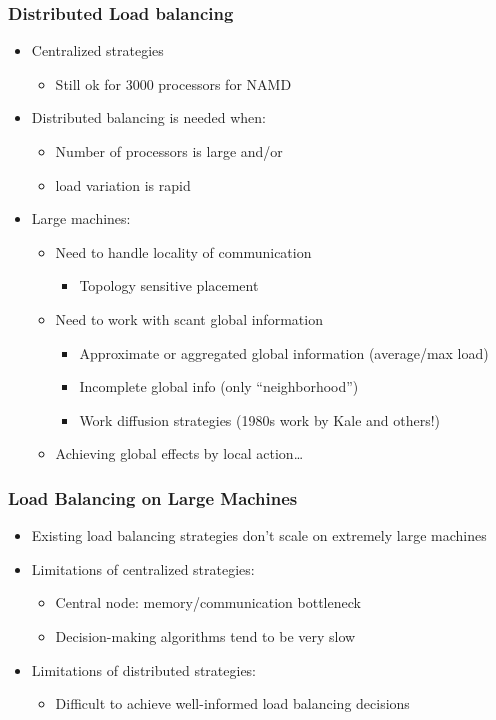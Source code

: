 \begin{frame}[fragile]
\frametitle{Distributed Load balancing}
\begin{itemize}
 \item Centralized strategies
 \begin{itemize}
  \item Still ok for 3000 processors for NAMD
 \end{itemize}
 \item Distributed balancing is needed when:
 \begin{itemize}
  \item Number of processors is large and/or 
  \item load variation is rapid
 \end{itemize}
 \item Large machines: 
 \begin{itemize}
  \item Need to handle locality of communication
  \begin{itemize}
   \item Topology sensitive placement
  \end{itemize}
  \item Need to work with scant global information
  \begin{itemize}
   \item Approximate or aggregated global information (average/max load)
   \item Incomplete global info (only “neighborhood”)
   \item Work diffusion strategies (1980s work by Kale and others!)
  \end{itemize}
  \item Achieving global effects by local action…
 \end{itemize}
\end{itemize}
\end{frame}

\begin{frame}[fragile]
\frametitle{Load Balancing on Large Machines}
\begin{itemize}
 \item Existing load balancing strategies don’t scale on extremely large machines
 \item Limitations of centralized strategies:
 \begin{itemize}
  \item Central node: memory/communication bottleneck
  \item Decision-making algorithms tend to be very slow
 \end{itemize}
 \item Limitations of distributed strategies:
 \begin{itemize}
  \item Difficult to achieve well-informed load balancing decisions
 \end{itemize}
\end{itemize}
\end{frame}


